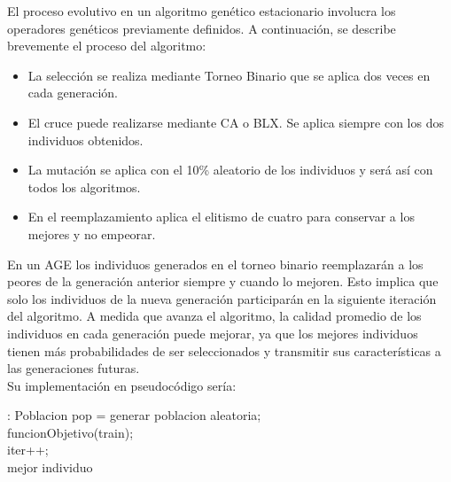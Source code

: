 El proceso evolutivo en un algoritmo genético estacionario involucra los operadores genéticos previamente definidos.  A continuación, se describe brevemente el proceso del algoritmo:
\begin{itemize}
	\item La selección se realiza mediante Torneo Binario que se aplica dos veces en cada generación.
	\item El cruce puede realizarse mediante CA o BLX. Se aplica siempre con los dos individuos obtenidos.
	\item La mutación se aplica con el 10\% aleatorio de los individuos y será así con todos los algoritmos.
	\item En el reemplazamiento aplica el elitismo de cuatro para conservar a los mejores y no empeorar.
\end{itemize}

En un AGE los individuos generados en el torneo binario reemplazarán a los peores de la generación anterior siempre y cuando lo mejoren. Esto implica que solo los individuos de la nueva generación participarán en la siguiente iteración del algoritmo. A medida que avanza el algoritmo, la calidad promedio de los individuos en cada generación puede mejorar, ya que los mejores individuos tienen más probabilidades de ser seleccionados y transmitir sus características a las generaciones futuras.\\

Su implementación en pseudocódigo sería:\\
\begin{algorithm}[H]
	
	
	\BlankLine
	:
	\BlankLine
	Poblacion pop = generar poblacion aleatoria;\\
	funcionObjetivo(train);\\
	iter++;\\
	
	\Return mejor individuo\;
\end{algorithm}

